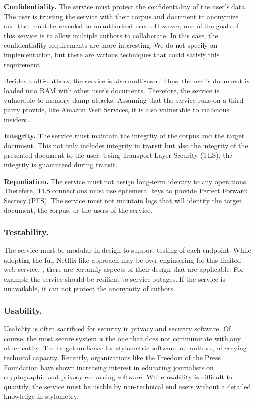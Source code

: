 \documentclass[letterpaper]{article}
\begin{document}
{\bf Confidentiality.} The service must protect the confidentiality of
the user's data.  The user is trusting the service with their corpus
and document to anonymize and that must be revealed to unauthorized
users.  However, one of the goals of this service is to allow multiple
authors to collaborate.  In this case, the confidentiality
requirements are more interesting.  We do not specify an
implementation, but there are various techniques that could satisfy
this requirement.

Besides multi-authors, the service is also multi-user.  Thus, the
user's document is loaded into RAM with other user's documents.
Therefore, the service is vulnerable to memory dump attacks.  Assuming
that the service runs on a third party provide, like Amazon Web
Services, it is also vulnerable to malicious insiders
\cite{conf/dsn/RochaC11}.

{\bf Integrity.}  The service must maintain the integrity of the
corpus and the target document.  This not only includes integrity in
transit but also the integrity of the presented document to the user.
Using Transport Layer Security (TLS), the integrity is guaranteed
during transit.

{\bf Repudiation.}  The service must not assign long-term identity
to any operations.  Therefore, TLS connections must use ephemeral
keys to provide Perfect Forward Secrecy (PFS).  The service must not
maintain logs that will identify the target document, the corpus, or
the users of the service.

\subsubsection{Testability.}

The service must be modular in design to support testing of each
endpoint.  While adopting the full Netflix-like approach may be
over-engineering for this limited web-service,
\cite{Tseitlin:2013:AO:2492007.2492022}, there are certainly aspects
of their design that are applicable.  For example the service should
be resilient to service outages.  If the service is unavailable, it
can not protect the anonymity of authors.

\subsubsection{Usability.}

Usability is often sacrificed for security in privacy and security
software.  Of course, the most secure system is the one that does not
communicate with any other entity.  The target audience for
stylometric software are authors, of varying technical capacity.
Recently, organizations like the Freedom of the Press Foundation
\cite{pressfreedom} have shown increasing interest in educating
journalists on cryptographic and privacy enhancing software.  While
usability is difficult to quantify, the service must be usable by
non-technical end users without a detailed knowledge in stylometry.
\end{document}
